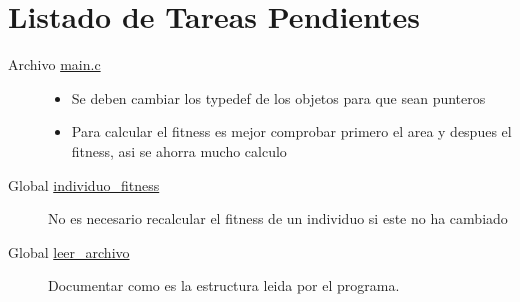 \hypertarget{todo}{}\section{Listado de Tareas Pendientes}\label{todo}
\label{todo__todo000003}
\hypertarget{todo__todo000003}{}
 \begin{description}
\item[Archivo \hyperlink{main_8c}{main.c} ]\begin{itemize}
\item Se deben cambiar los typedef de los objetos para que sean punteros\item Para calcular el fitness es mejor comprobar primero el area y despues el fitness, asi se ahorra mucho calculo \end{itemize}
\end{description}


\label{todo__todo000002}
\hypertarget{todo__todo000002}{}
 \begin{description}
\item[Global \hyperlink{group__genetic_gf152bd4602acec2166cc4b91e8c8919a_gf152bd4602acec2166cc4b91e8c8919a}{individuo\_\-fitness} ]No es necesario recalcular el fitness de un individuo si este no ha cambiado \end{description}


\label{todo__todo000001}
\hypertarget{todo__todo000001}{}
 \begin{description}
\item[Global \hyperlink{group__genetic_g6fed4910dd1f6172bb5a4e35a97bbe56_g6fed4910dd1f6172bb5a4e35a97bbe56}{leer\_\-archivo} ]Documentar como es la estructura leida por el programa. \end{description}
